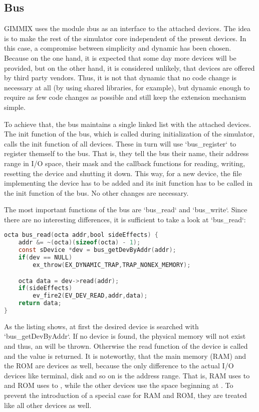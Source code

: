 \subsection{Bus}

GIMMIX uses the module \i{bus} as an interface to the attached devices. The idea is to make the rest of the simulator core independent of the present devices. In this case, a compromise between simplicity and dynamic has been chosen. Because on the one hand, it is expected that some day more devices will be provided, but on the other hand, it is considered unlikely, that devices are offered by third party vendors. Thus, it is not that dynamic that no code change is necessary at all (by using shared libraries, for example), but dynamic enough to require as few code changes as possible and still keep the extension mechanism simple.

To achieve that, the bus maintains a single linked list with the attached devices. The init function of the bus, which is called during initialization of the simulator, calls the init function of all devices. These in turn will use `bus_register` to register themself to the bus. That is, they tell the bus their name, their address range in I/O space, their  mask and the callback functions for reading, writing, resetting the device and shutting it down. This way, for a new device, the file implementing the device has to be added and its init function has to be called in the init function of the bus. No other changes are necessary.

The most important functions of the bus are `bus_read` and `bus_write`. Since there are no interesting differences, it is sufficient to take a look at `bus_read`:
\begin{lstlisting}[language=C,caption={Implementation of {\tt bus\_read}}]
octa bus_read(octa addr,bool sideEffects) {
	addr &= ~(octa)(sizeof(octa) - 1);
	const sDevice *dev = bus_getDevByAddr(addr);
	if(dev == NULL)
		ex_throw(EX_DYNAMIC_TRAP,TRAP_NONEX_MEMORY);

	octa data = dev->read(addr);
	if(sideEffects)
		ev_fire2(EV_DEV_READ,addr,data);
	return data;
}
\end{lstlisting}
As the listing shows, at first the desired device is searched with `bus_getDevByAddr`. If no device is found, the physical memory will not exist and thus, an  will be thrown. Otherwise the read function of the device is called and the value is returned. It is noteworthy, that the main memory (RAM) and the ROM are devices as well, because the only difference to the actual I/O devices like terminal, disk and so on is the address range. That is, RAM uses  to  and ROM uses  to , while the other devices use the space beginning at . To prevent the introduction of a special case for RAM and ROM, they are treated like all other devices as well.
